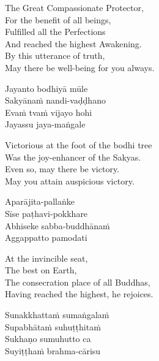 \begin{english-verses}
  The Great Compassionate Protector,\\
  For the benefit of all beings,\\
  Fulfilled all the Perfections\\
  And reached the highest Awakening.\\
  By this utterance of truth,\\
  May there be well-being for you always.
\end{english-verses}

\begin{pali-hang-continued}
  Jayanto bodhiyā mūle\\
  Sakyānaṁ nandi-vaḍḍhano\\
  Evaṁ tvaṁ vijayo hohi\\
  Jayassu jaya-maṅgale
\end{pali-hang-continued}

\begin{english-verses}
  Victorious at the foot of the bodhi tree\\
  Was the joy-enhancer of the Sakyas.\\
  Even so, may there be victory.\\
  May you attain auspicious victory.
\end{english-verses}

\begin{pali-hang-continued}
  Aparājita-pallaṅke\\
  Sīse paṭhavi-pokkhare\\
  Abhiseke sabba-buddhānaṁ\\
  Aggappatto pamodati
\end{pali-hang-continued}

\begin{english-verses}
  At the invincible seat,\\
  The best on Earth,\\
  The consecration place of all Buddhas,\\
  Having reached the highest, he rejoices.
\end{english-verses}

\suttaRef{[MJG]}

\begin{pali-hang-continued}
  Sunakkhattaṁ sumaṅgalaṁ\\
  Supabhātaṁ suhuṭṭhitaṁ\\
  Sukhaṇo sumuhutto ca\\
  Suyiṭṭhaṁ brahma-cārisu
\end{pali-hang-continued}


